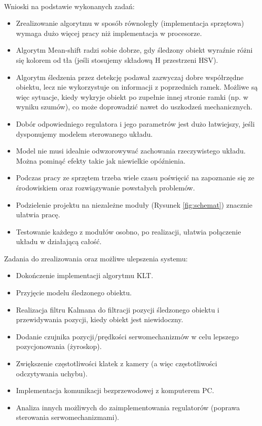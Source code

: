 \paragraph*{}
Wnioski na podstawie wykonanych zadań:
\begin{itemize}
\item Zrealizowanie algorytmu w sposób równoległy (implementacja sprzętowa) wymaga dużo więcej pracy niż implementacja w procesorze.
\item Algorytm Mean-shift radzi sobie dobrze, gdy śledzony obiekt wyraźnie różni się kolorem od tła (jeśli stosujemy składową H przestrzeni HSV).
\item Algorytm śledzenia przez detekcję podawał zazwyczaj dobre współrzędne obiektu, lecz nie wykorzystuje on informacji z poprzednich ramek. Możliwe są więc sytuacje, kiedy wykryje obiekt po zupełnie innej stronie ramki (np. w wyniku szumów), co może doprowadzić nawet do uszkodzeń mechanicznych.
\item Dobór odpowiedniego regulatora i jego parametrów jest dużo łatwiejszy, jeśli dysponujemy modelem sterowanego układu.
\item Model nie musi idealnie odwzorowywać zachowania rzeczywistego układu. Można pominąć efekty takie jak niewielkie opóźnienia.
\item Podczas pracy ze sprzętem trzeba wiele czasu poświęcić na zapoznanie się ze środowiskiem oraz rozwiązywanie powstałych problemów.
\item Podzielenie projektu na niezależne moduły (Rysunek \ref{fig:schemat}) znacznie ułatwia pracę.
\item Testowanie każdego z modułów osobno, po realizacji, ułatwia połączenie układu w działającą całość.
\end{itemize}

Zadania do zrealizowania oraz możliwe ulepszenia systemu:
\begin{itemize}
\item Dokończenie implementacji algorytmu KLT.
\item Przyjęcie modelu śledzonego obiektu.
\item Realizacja filtru Kalmana do filtracji pozycji śledzonego obiektu i przewidywania pozycji, kiedy obiekt jest niewidoczny.
\item Dodanie czujnika pozycji/prędkości serwomechanizmów w celu lepszego pozycjonowania (żyroskop).
\item Zwiększenie częstotliwości klatek z kamery (a więc częstotliwości odczytywania uchybu).
\item Implementacja komunikacji bezprzewodowej z komputerem PC.
\item Analiza innych możliwych do zaimplementowania regulatorów (poprawa sterowania serwomechanizmami).
\end{itemize}